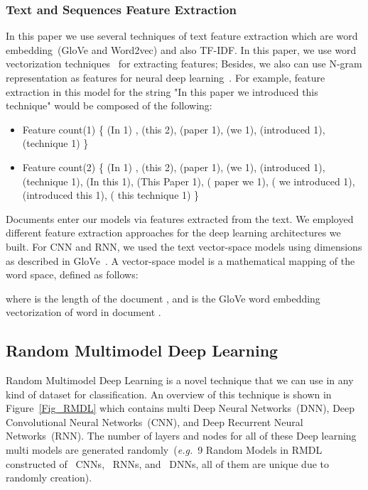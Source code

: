 \documentclass[sigconf, final]{acmart}
\begin{document}
\subsubsection{Text and Sequences Feature Extraction}
In this paper we use several techniques of text feature extraction which are word embedding~(GloVe and Word2vec) and also TF-IDF. 
In this paper, we use word vectorization techniques~\cite{hotta2010word} for extracting features; Besides, we also can use N-gram representation as features for neural deep learning~\cite{kevselj2003n,dave2003mining}. For example, feature extraction in this model for the string "In this paper we introduced this technique" would be composed of the following:
\begin{itemize}
\item Feature count(1) \{ (In 1) , (this 2), (paper 1), (we 1), (introduced 1), (technique 1) \}

\item Feature count(2) \{ (In 1) , (this 2), (paper 1), (we 1), (introduced 1), (technique 1), (In this 1), (This Paper 1), ( paper we 1), ( we introduced 1), (introduced this 1), ( this technique 1) \}

\end{itemize}
Documents enter our models via features extracted from the text. We employed different feature extraction approaches for the deep learning architectures we built. For CNN and RNN, we used the text vector-space models using  dimensions as described in GloVe~\cite{pennington2014glove}. A vector-space model is a mathematical mapping of the word space, defined as follows:

where  is the length of the document , and  is the GloVe word embedding vectorization of word  in document .








\subsection{Random Multimodel Deep Learning}\label{subsect:RMDL}
Random Multimodel Deep Learning is a novel technique that we can use in any kind of dataset for classification. An overview of this technique is shown in Figure~\ref{Fig_RMDL} which contains multi Deep Neural Networks~(DNN), Deep Convolutional Neural Networks~(CNN), and Deep Recurrent Neural Networks~(RNN). The number of layers and nodes for all of these Deep learning multi models are generated randomly~(\textit{e.g.}~9 Random Models in RMDL constructed of~ CNNs,~ RNNs, and~ DNNs, all of them are unique due to randomly creation). 
\end{document}
